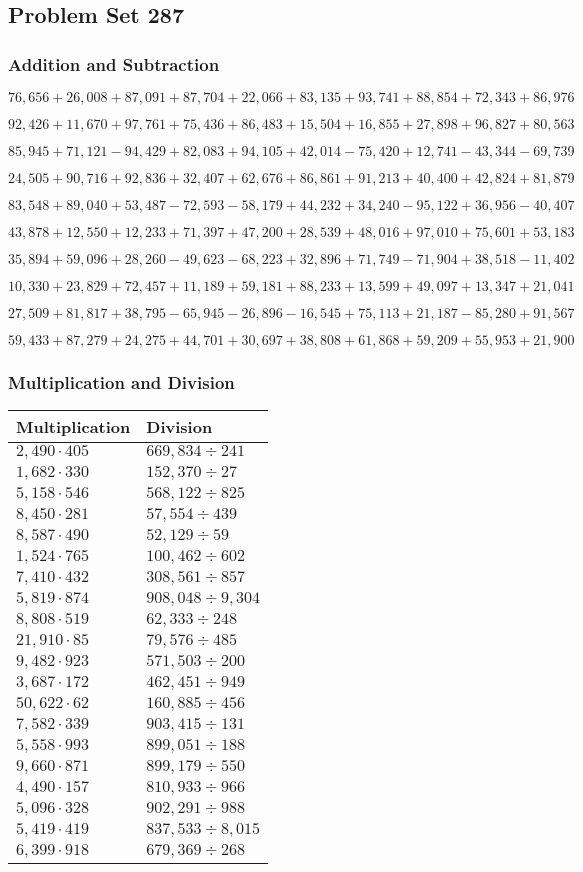 \hypertarget{problem-set-287}{%
\subsection{Problem Set 287}\label{problem-set-287}}

\hypertarget{addition-and-subtraction}{%
\subsubsection{Addition and
Subtraction}\label{addition-and-subtraction}}

\(76,656+26,008+87,091+87,704+22,066+83,135+93,741+88,854+72,343+86,976\)

\(92,426+11,670+97,761+75,436+86,483+15,504+16,855+27,898+96,827+80,563\)

\(85,945+71,121-94,429+82,083+94,105+42,014-75,420+12,741-43,344-69,739\)

\(24,505+90,716+92,836+32,407+62,676+86,861+91,213+40,400+42,824+81,879\)

\(83,548+89,040+53,487-72,593-58,179+44,232+34,240-95,122+36,956-40,407\)

\(43,878+12,550+12,233+71,397+47,200+28,539+48,016+97,010+75,601+53,183\)

\(35,894+59,096+28,260-49,623-68,223+32,896+71,749-71,904+38,518-11,402\)

\(10,330+23,829+72,457+11,189+59,181+88,233+13,599+49,097+13,347+21,041\)

\(27,509+81,817+38,795-65,945-26,896-16,545+75,113+21,187-85,280+91,567\)

\(59,433+87,279+24,275+44,701+30,697+38,808+61,868+59,209+55,953+21,900\)

\hypertarget{multiplication-and-division}{%
\subsubsection{Multiplication and
Division}\label{multiplication-and-division}}

\begin{longtable}[]{@{}ll@{}}
\toprule
Multiplication & Division\tabularnewline
\midrule
\endhead
\(2,490\cdot405\) & \(669,834÷241\)\tabularnewline
\(1,682\cdot330\) & \(152,370 ÷27\)\tabularnewline
\(5,158\cdot546\) & \(568,122÷825\)\tabularnewline
\(8,450\cdot281\) & \(57,554 ÷439\)\tabularnewline
\(8,587\cdot490\) & \(52,129÷59\)\tabularnewline
\(1,524\cdot765\) & \(100,462÷602\)\tabularnewline
\(7,410\cdot432\) & \(308,561÷857\)\tabularnewline
\(5,819\cdot874\) & \(908,048÷9,304\)\tabularnewline
\(8,808\cdot519\) & \(62,333÷248\)\tabularnewline
\(21,910\cdot85\) & \(79,576÷485\)\tabularnewline
\(9,482\cdot923\) & \(571,503÷200\)\tabularnewline
\(3,687\cdot172\) & \(462,451÷949\)\tabularnewline
\(50,622\cdot62\) & \(160,885÷456\)\tabularnewline
\(7,582\cdot339\) & \(903,415÷131\)\tabularnewline
\(5,558\cdot993\) & \(899,051÷188\)\tabularnewline
\(9,660\cdot871\) & \(899,179÷550\)\tabularnewline
\(4,490\cdot157\) & \(810,933÷966\)\tabularnewline
\(5,096\cdot328\) & \(902,291÷988\)\tabularnewline
\(5,419\cdot419\) & \(837,533÷8,015\)\tabularnewline
\(6,399\cdot918\) & \(679,369÷268\)\tabularnewline
\bottomrule
\end{longtable}
